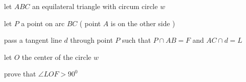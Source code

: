 let $ ABC $ an equilateral triangle with circum circle $ w $

let $ P $ a point on arc $ BC $ ( point $ A $ is on the other side )

pass a tangent line $ d $ through point $ P $ such that $ P \cap AB = F $ and $ AC \cap d = L $

let $ O $ the center of the circle $ w $

prove that $ \angle LOF > 90^{0} $